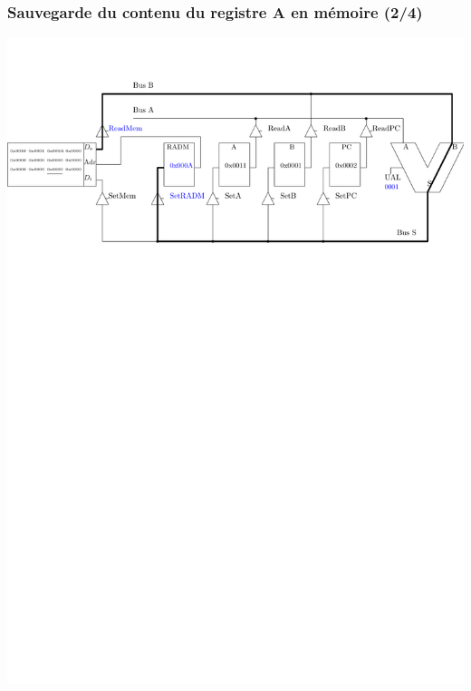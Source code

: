 \documentclass{beamer}
\begin{document}
\begin{frame}
\frametitle{Sauvegarde du contenu du registre A en mémoire (2/4)}
\includegraphics[width=\linewidth]{Figs/premier_chemin_sta2.pdf}
\end{frame}
\end{document}

